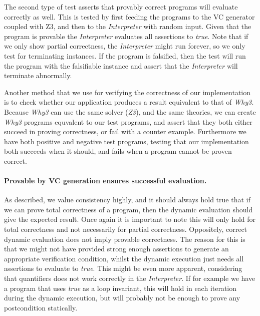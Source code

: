 The second type of test asserts that provably correct programs will evaluate correctly as well.
This is tested by first feeding the programs to the VC generator coupled with Z3, and then to the \textit{Interpreter} with random input.
Given that the program is provable the \textit{Interpreter} evaluates all assertions to \textit{true}.
Note that if we only show partial correctness, the \textit{Interpreter} might run forever, so we only test for terminating instances.
If the program is falsified, then the test will run the program with the falsifiable instance and assert that the \textit{Interpreter} will terminate abnormally.

Another method that we use for verifying the correctness of our implementation is to check whether our application produces a result equivalent to that of \textit{Why3}.
Because \textit{Why3} can use the same solver (\textit{Z3}), and the same theories, we can create \textit{Why3} programs equvalent to our test programs, and assert that they both either succeed in proving correctness, or fail with a counter example.
Furthermore we have both positive and negative test programs, testing that our implementation both succeeds when it should, and fails when a program cannot be proven correct.

\paragraph{Provable by VC generation ensures successful evaluation.}

As described, we value consistency highly, and it should always hold true that if we can prove total correctness of a program, then the dynamic evaluation should give the expected result. Once again it is important to note this will only hold for total correctness and not necessarily for partial correctness.
Oppositely, correct dynamic evaluation does not imply provable correctness.
The reason for this is that we might not have provided strong enough assertions to generate an appropriate verification condition, whilst the dynamic execution just needs all assertions to evaluate to \textit{true}. 
This might be even more apparent, considering that quantifiers does not work correctly in the \textit{Interpreter}.
If for example we have a program that uses \textit{true} as a loop invariant, this will hold in each iteration during the dynamic execution, but will probably not be enough to prove any postcondition statically.

